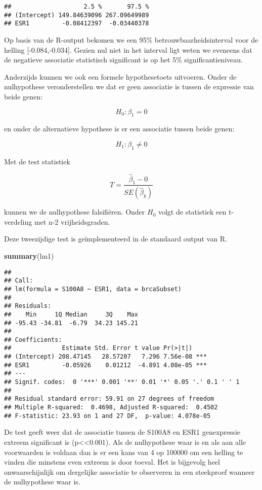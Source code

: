\documentclass[
  12pt,dutch,coursenotes]{book}
\newenvironment{Shaded}{\begin{snugshade}}{\end{snugshade}}
\newcommand{\KeywordTok}[1]{\textcolor[rgb]{0.13,0.29,0.53}{\textbf{#1}}}
\newcommand{\NormalTok}[1]{#1}
\theoremstyle{definition}
\theoremstyle{definition}
\theoremstyle{definition}
\theoremstyle{remark}
\begin{document}
\begin{verbatim}
##                    2.5 %       97.5 %
## (Intercept) 149.84639096 267.09649989
## ESR1         -0.08412397  -0.03440378
\end{verbatim}

Op basis van de R-output bekomen we een 95\% betrouwbaarheidsinterval voor de helling {[}-0.084,-0.034{]}.
Gezien nul niet in het interval ligt weten we eveneens dat de negatieve associatie statistisch significant is op het 5\% significantieniveau.

Anderzijds kunnen we ook een formele hypothesetoets uitvoeren. Onder de nulhypothese veronderstellen we dat er geen associatie is tussen de expressie van beide genen:

\[H_0: \beta_1=0\]

en onder de alternatieve hypothese is er een associatie tussen beide genen:

\[H_1: \beta_1\neq0\]

Met de test statistiek

\[T=\frac{\hat{\beta}_1-0}{SE(\hat{\beta}_k)}\]

kunnen we de nulhypothese falsifiëren. Onder \(H_0\) volgt de statistiek een t-verdeling met n-2 vrijheidsgraden.

Deze tweezijdige test is geïmplementeerd in de standaard output van R.

\begin{Shaded}
\begin{Highlighting}[]
\KeywordTok{summary}\NormalTok{(lm1)}
\end{Highlighting}
\end{Shaded}

\begin{verbatim}
## 
## Call:
## lm(formula = S100A8 ~ ESR1, data = brcaSubset)
## 
## Residuals:
##    Min     1Q Median     3Q    Max 
## -95.43 -34.81  -6.79  34.23 145.21 
## 
## Coefficients:
##              Estimate Std. Error t value Pr(>|t|)    
## (Intercept) 208.47145   28.57207   7.296 7.56e-08 ***
## ESR1         -0.05926    0.01212  -4.891 4.08e-05 ***
## ---
## Signif. codes:  0 '***' 0.001 '**' 0.01 '*' 0.05 '.' 0.1 ' ' 1
## 
## Residual standard error: 59.91 on 27 degrees of freedom
## Multiple R-squared:  0.4698, Adjusted R-squared:  0.4502 
## F-statistic: 23.93 on 1 and 27 DF,  p-value: 4.078e-05
\end{verbatim}

De test geeft weer dat de associatie tussen de S100A8 en ESR1 genexpressie extreem significant is (p\textless\textless0.001). Als de nulhypothese waar is en als aan alle voorwaarden is voldaan dan is er een kans van 4 op 100000 om een helling te vinden die minstens even extreem is door toeval. Het is bijgevolg heel onwaarschijnlijk om dergelijke associatie te observeren in een steekproef wanneer de nulhypothese waar is.
\end{document}
